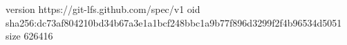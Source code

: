version https://git-lfs.github.com/spec/v1
oid sha256:dc73af804210bd34b67a3e1a1bcf248bbc1a9b77f896d3299f2f4b96534d5051
size 626416
